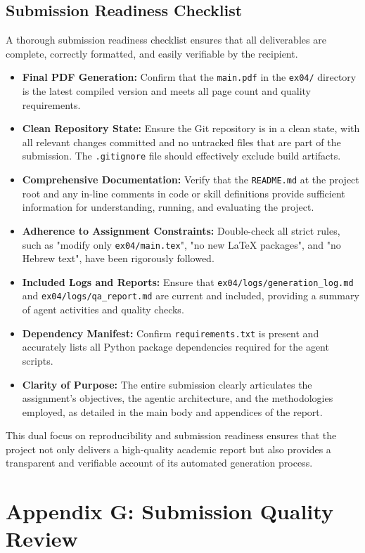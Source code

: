 \documentclass{custom-academic-template}
\begin{document}
\subsection{Submission Readiness Checklist}
A thorough submission readiness checklist ensures that all deliverables are complete, correctly formatted, and easily verifiable by the recipient.
\begin{itemize}
    \item \textbf{Final PDF Generation:} Confirm that the \texttt{main.pdf} in the \texttt{ex04/} directory is the latest compiled version and meets all page count and quality requirements.
    \item \textbf{Clean Repository State:} Ensure the Git repository is in a clean state, with all relevant changes committed and no untracked files that are part of the submission. The \texttt{.gitignore} file should effectively exclude build artifacts.
    \item \textbf{Comprehensive Documentation:} Verify that the \texttt{README.md} at the project root and any in-line comments in code or skill definitions provide sufficient information for understanding, running, and evaluating the project.
    \item \textbf{Adherence to Assignment Constraints:} Double-check all strict rules, such as "modify only \texttt{ex04/main.tex}", "no new LaTeX packages", and "no Hebrew text", have been rigorously followed.
    \item \textbf{Included Logs and Reports:} Ensure that \texttt{ex04/logs/generation\_log.md} and \texttt{ex04/logs/qa\_report.md} are current and included, providing a summary of agent activities and quality checks.
    \item \textbf{Dependency Manifest:} Confirm \texttt{requirements.txt} is present and accurately lists all Python package dependencies required for the agent scripts.
    \item \textbf{Clarity of Purpose:} The entire submission clearly articulates the assignment's objectives, the agentic architecture, and the methodologies employed, as detailed in the main body and appendices of the report.
\end{itemize}
This dual focus on reproducibility and submission readiness ensures that the project not only delivers a high-quality academic report but also provides a transparent and verifiable account of its automated generation process.

\newpage
\section{Appendix G: Submission Quality Review}
\end{document}
